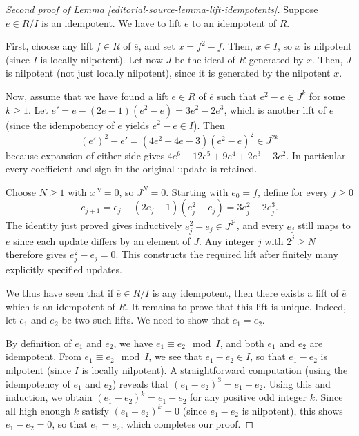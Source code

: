 \begin{proof}[Second proof of Lemma \ref{editorial-source-lemma-lift-idempotents}]
Suppose $\overline{e} \in R/I$ is an idempotent.
We have to lift $\overline{e}$ to an idempotent of $R$.

\medskip\noindent
First, choose any lift $f \in R$ of $\overline{e}$, and set
$x = f^2 - f$. Then, $x \in I$, so $x$ is nilpotent (since $I$
is locally nilpotent). Let now $J$ be the ideal of $R$ generated
by $x$. Then, $J$ is nilpotent (not just locally nilpotent),
since it is generated by the nilpotent $x$.

\medskip\noindent
Now, assume that we have found a lift $e \in R$ of $\overline{e}$
such that $e^2 - e \in J^k$ for some $k \geq 1$.
Let $e' = e - (2e - 1)(e^2 - e) = 3e^2 - 2e^3$, which is another
lift of $\overline{e}$ (since the idempotency of $\overline{e}$
yields $e^2 - e \in I$). Then
$$
(e')^2 - e' = (4e^2 - 4e - 3)(e^2 - e)^2 \in J^{2k}
$$
because expansion of either side gives
$4e^6-12e^5+9e^4+2e^3-3e^2$.
In particular every coefficient and sign in the original update is retained.

\medskip\noindent
Choose $N\geq1$ with $x^N=0$, so $J^N=0$.
Starting with $e_0=f$, define for every $j\geq0$
$$
e_{j+1}=e_j-(2e_j-1)(e_j^2-e_j)=3e_j^2-2e_j^3.
$$
The identity just proved gives inductively
$e_j^2-e_j\in J^{2^j}$, and every $e_j$ still maps to
$\overline e$ since each update differs by an element of $J$.
Any integer $j$ with $2^j\geq N$ therefore gives
$e_j^2-e_j=0$. This constructs the required lift after finitely
many explicitly specified updates.

\medskip\noindent
We thus have seen that if $\overline{e} \in R/I$ is any
idempotent, then there exists a lift of $\overline{e}$
which is an idempotent of $R$.
It remains to prove that this lift is unique. Indeed, let
$e_1$ and $e_2$ be two such lifts. We
need to show that $e_1 = e_2$.

\medskip\noindent
By definition of $e_1$ and $e_2$, we have $e_1 \equiv e_2
\mod I$, and both $e_1$ and $e_2$ are idempotent. From
$e_1 \equiv e_2 \mod I$, we see that $e_1 - e_2 \in I$,
so that $e_1 - e_2$ is nilpotent (since $I$ is locally nilpotent).
A straightforward
computation (using the idempotency of $e_1$ and $e_2$)
reveals that $(e_1 - e_2)^3 = e_1 - e_2$. Using this and
induction, we obtain $(e_1 - e_2)^k = e_1 - e_2$ for any
positive odd integer $k$. Since all high enough $k$ satisfy
$(e_1 - e_2)^k = 0$ (since $e_1 - e_2$ is nilpotent),
this shows $e_1 - e_2 = 0$, so that $e_1 = e_2$, which
completes our proof.
\end{proof}


